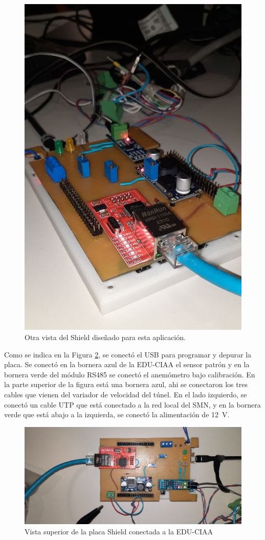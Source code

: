 \begin{figure}[H]
    \centering
    \includegraphics[width=0.5\linewidth]{Figuras/datalogger/Hardware/poncho2.jpg}
    \caption{Otra vista del Shield diseñado para esta aplicación.}
    \label{fig:poncho2}
\end{figure}

Como se indica en la Figura \ref{fig:poncho3}, se conectó el USB para programar y depurar la placa. Se conectó en la bornera azul de la EDU-CIAA el sensor patrón y en la bornera verde del módulo RS485 se conectó el anemómetro bajo calibración. En la parte superior de la figura está una  bornera azul, ahi se conectaron los tres cables que vienen del variador de velocidad del túnel. En el lado izquierdo, se conectó un cable UTP que está conectado a la red local del SMN, y en la bornera verde que está abajo a la izquierda,  se conectó la alimentación de \SI{12}{\volt}.

\begin{figure}[H]
    \centering
    \includegraphics[width=1\linewidth]{Figuras/datalogger/Hardware/poncho3.jpg}
    \caption{Vista superior de la placa Shield conectada a la EDU-CIAA}
    \label{fig:poncho3}
\end{figure}


